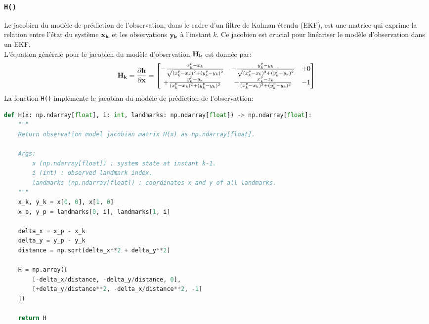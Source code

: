\documentclass[../CSC_5RO12_TA_TP2.tex]{subfiles}
\begin{document}
\subsubsection{\texttt{H()}}
\begin{definition}
    Le jacobien du modèle de prédiction de l'observation, dans le cadre d'un filtre de Kalman étendu (EKF), est une matrice qui exprime la relation entre l'état du système $\bf{x}_{k}$ et les observations $\bf{y}_{k}$ à l'instant $k$. Ce jacobien est crucial pour linéariser le modèle d'observation dans un EKF.\\

    \noindent L'équation générale pour le jacobien du modèle d'observation $\bf{H}_{k}$ est donnée par:
    \begin{equation}
        \bf{H}_{k} = \frac{\partial h}{\partial \bf{x}} = \begin{bmatrix}
            -\frac{x^{p}_{k} - x_{k}}{\sqrt{(x^{p}_{k} - x_{k})^{2} + (y^{p}_{k} - y_{k})^{2}}} & -\frac{y^{p}_{k} - y_{k}}{\sqrt{(x^{p}_{k} - x_{k})^{2} + (y^{p}_{k} - y_{k})^{2}}} & +0\\
            +\frac{y^{p}_{k} - y_{k}}{(x^{p}_{k} - x_{k})^{2} + (y^{p}_{k} - y_{k})^{2}} & -\frac{x^{p}_{k} - x_{k}}{(x^{p}_{k} - x_{k})^{2} + (y^{p}_{k} - y_{k})^{2}} & -1\\
        \end{bmatrix}
    \end{equation}
    La fonction \texttt{H()} implémente le jacobian du modèle de prédiction de l'observattion:
    \begin{scriptsize}\mycode
        \begin{lstlisting}[language=Python, caption=\texttt{H()}]
def H(x: np.ndarray[float], i: int, landmarks: np.ndarray[float]) -> np.ndarray[float]:
    """
    Return observation model jacobian matrix H(x) as np.ndarray[float].

    Args:
        x (np.ndarray[float]) : system state at instant k-1.
        i (int) : observed landmark index.
        landmarks (np.ndarray[float]) : coordinates x and y of all landmarks.
    """
    x_k, y_k = x[0, 0], x[1, 0]
    x_p, y_p = landmarks[0, i], landmarks[1, i]

    delta_x = x_p - x_k
    delta_y = y_p - y_k
    distance = np.sqrt(delta_x**2 + delta_y**2)

    H = np.array([
        [-delta_x/distance, -delta_y/distance, 0],
        [+delta_y/distance**2, -delta_x/distance**2, -1]
    ])

    return H
        \end{lstlisting}
    \end{scriptsize}
\end{definition}
\end{document}
